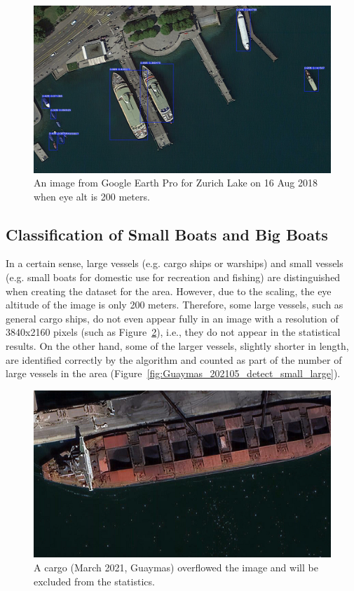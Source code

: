 \begin{figure}
    \centering
    \includegraphics[scale=0.1]{img/zurich.jpg}
    \caption{An image from Google Earth Pro for Zurich Lake on 16 Aug 2018 when eye alt is 200 meters.}
    \label{fig:zurich}
\end{figure}


\newpage
\subsection{Classification of Small Boats and Big Boats}
In a certain sense, large vessels (e.g. cargo ships or warships) and small vessels (e.g. small boats for domestic use for recreation and fishing) are distinguished when creating the dataset for the area. However, due to the scaling, the eye altitude of the image is only 200 meters. Therefore, some large vessels, such as general cargo ships, do not even appear fully in an image with a resolution of 3840x2160 pixels (such as Figure~\ref{fig:Guaymas_202103_overflow_screen}), i.e., they do not appear in the statistical results. On the other hand, some of the larger vessels, slightly shorter in length, are identified correctly by the algorithm and counted as part of the number of large vessels in the area (Figure~\ref{fig:Guaymas_202105_detect_small_large}).

\begin{figure}
    \centering
    \includegraphics[scale=0.11]{img/Guaymas_202103_overflow_screen.jpg}
    \caption{A cargo (March 2021, Guaymas) overflowed the image and will be excluded from the statistics.}
    \label{fig:Guaymas_202103_overflow_screen}
\end{figure}


